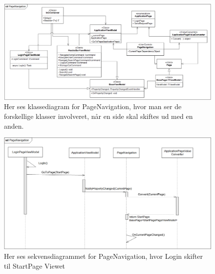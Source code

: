 \documentclass[SoftwareDesign/SoftwareDesign_main.tex]{subfiles}
\begin{document}
\begin{figure}[H]
    \centering
    \includegraphics[width=\textwidth]{SoftwareDesign/MVVMDesigns/Graphics/PageNavigationcd.png}
    \caption{Her ses klassediagram for PageNavigation, hvor man ser de forskellige klasser involveret, når en side skal skiftes ud med en anden.}
    \label{fig:PageNavigation_CD}
\end{figure}
\begin{figure}[H]
    \centering
    \includegraphics[width=\textwidth]{SoftwareDesign/MVVMDesigns/Graphics/PageNavigationSd.png}
    \caption{Her ses sekvensdiagrammet for PageNavigation, hvor Login skifter til StartPage Viewet}
    \label{fig:PageNavigation_SD}
\end{figure}
\end{document}
